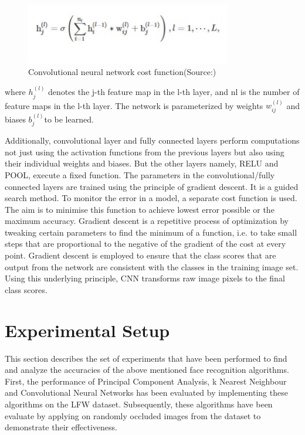 \documentclass[conference]{IEEEtran}
\begin{document}
\begin{figure}[h!]
 \centering
 \includegraphics[width = 9cm]{cnn_formula.JPG}
 \caption{ Convolutional neural network cost function(Source:\cite{lee2009convolutional})}
 \label{fig 6: Convolutional Neural Network cost function}
\end{figure}

where $h^{(l)}_j$ denotes the j-th feature map in the l-th layer, and nl is the number of feature maps in the l-th layer. The network is parameterized by weights $w_{ij}^{(l)}$ and biases $b_j^{(l)}$to be learned\cite{lee2009convolutional}.

Additionally, convolutional layer and fully connected layers perform computations not just using the activation functions from the previous layers but also using their individual weights and biases. But the other layers namely, RELU and POOL, execute a  fixed function. The parameters in the convolutional/fully connected layers are trained using the principle of gradient descent. It is a guided search method. To monitor the error in a model, a separate cost function is used. The aim is to minimise this function to achieve lowest error possible or the maximum accuracy. Gradient descent is a repetitive process of optimization by tweaking certain parameters to find the minimum of a function, i.e. to take small steps that are proportional to the negative of the gradient of the cost at every point. Gradient descent is employed to ensure that the class scores that are output from the network are consistent with the classes in the training image set. Using this underlying principle, CNN transforms raw image pixels to the final class scores. 

\section{Experimental Setup}
\label{sec:4 Experimental Setup} 


This section describes the set of experiments that have been performed to find and analyze the accuracies of the above mentioned face recognition algorithms. First, the performance of Principal Component Analysis, k Nearest Neighbour and Convolutional Neural Networks has been evaluated by implementing these algorithms on the LFW dataset. Subsequently, these algorithms have been evaluate by applying on randomly occluded images from the dataset to demonstrate their effectiveness.
\end{document}
